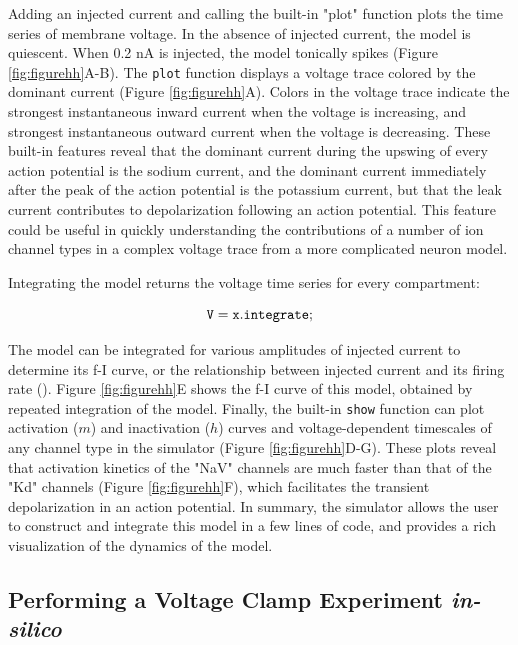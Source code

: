 \documentclass{frontiersSCNS} %
\begin{document}
Adding an injected current and calling the built-in "plot" function plots the time series of membrane voltage. In the absence of injected current, the model is quiescent. When 0.2 nA is injected, the model tonically spikes (Figure \ref{fig:figurehh}A-B).  The \texttt{plot} function displays a voltage trace colored by the dominant current (Figure \ref{fig:figurehh}A). Colors in the voltage trace indicate the strongest instantaneous inward current when the voltage is increasing, and strongest instantaneous outward current when the voltage is decreasing. These built-in features reveal that the dominant current during the upswing of every action potential is the sodium current, and the dominant current immediately after the peak of the action potential is the potassium current, but that the leak current contributes to depolarization following an action potential. This feature could be useful in quickly understanding the contributions of a number of ion channel types in a complex voltage trace from a more complicated neuron model. 

Integrating the model returns the voltage time series for every compartment: 

\begin{equation}
{\tt V = x.integrate;}
\end{equation}

The model can be integrated for various amplitudes of injected current to determine its f-I curve, or the relationship between injected current and its firing rate (\cite{kisperskyIncreaseSodiumConductance2012}). Figure \ref{fig:figurehh}E shows the f-I curve of this model, obtained by repeated integration of the model.  Finally, the built-in \texttt{show} function can plot activation ($m$) and inactivation ($h$) curves and voltage-dependent timescales of any channel type in the simulator (Figure \ref{fig:figurehh}D-G). These plots reveal that activation kinetics of the "NaV" channels are much faster than that of the "Kd" channels (Figure \ref{fig:figurehh}F), which facilitates the transient depolarization in an action potential. In summary, the simulator allows the user to construct and integrate this model in a few lines of code, and provides a rich visualization of the dynamics of the model. 


%
%
%
%
%
%




\subsection{Performing a Voltage Clamp Experiment \textit{in-silico}}
\end{document}
